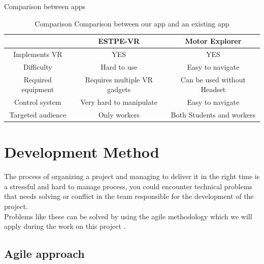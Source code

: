 \documentclass[]{report}
\begin{document}
{\Large{\color[HTML]{00D2CB} Comparison between  apps}}
\begin{table}[H]

	\begin{center}
	\begin{tabular}{|c|c|c|}
		\hline
		{\color[HTML]{000000} }                   & {\color[HTML]{000000} ESTPE-VR}                     & {\color[HTML]{000000} Motor Explorer}              \\ \hline
		{\color[HTML]{000000} Implements VR}      & {\color[HTML]{009901} YES}                          & {\color[HTML]{009901} YES}                         \\ \hline
		{\color[HTML]{000000} Difficulty}         & {\color[HTML]{FE0000} Hard to use}                  & {\color[HTML]{009901} Easy to navigate}            \\ \hline
		{\color[HTML]{000000} Required equipment} & {\color[HTML]{FE0000} Requires multiple VR gadgets} & {\color[HTML]{009901} Can be used without Headset} \\ \hline
		{\color[HTML]{000000} Control system}     & {\color[HTML]{FE0000} Very hard to manipulate}      & {\color[HTML]{009901} Easy to navigate}            \\ \hline
		{\color[HTML]{000000} Targeted audience}  & {\color[HTML]{FE0000} Only workers}                 & {\color[HTML]{009901} Both Students and workers}   \\ \hline
	\end{tabular}
\end{center}
	\caption[Comparison between our app and an existing app]{Comparison Comparison between our app and an existing app}
\end{table}

\section{Development Method}
The process of organizing a project and managing to deliver it in the right time
is a stressful and hard to manage process, you could encounter technical
problems that needs solving or conflict in the team responsible for the
development of the project. \\
Problems like these can be solved by using the agile methodology which we
will apply during the work on this project .

\subsection{Agile approach}
\end{document}
